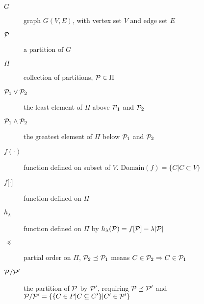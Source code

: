 \begin{description}
\item[$G$] graph $G(V,E)$, with vertex set $V$ and edge set $E$
\item[$\P$] a partition of $G$
\item[$\Pi$] collection of partitions, $\P \in \Pi$
\item[$\P_1 \vee \P_2$] the least element of $\Pi$ above $\P_1$ and $\P_2$
\item[$\P_1 \wedge \P_2$] the greatest element of $\Pi$ below $\P_1$ and $\P_2$
\item[$f(\cdot)$] function defined on subset of $V$. $\mathrm{Domain}(f)=\{C| C\subset V\}$
\item[$f{[}\cdot{]}$] function defined on $\Pi$
\item[$h_{\lambda}$] function defined on $\Pi$ by $h_{\lambda}(\P)=f[\P]-\lambda\abs{\P}$
\item[$\preceq$] partial order on $\Pi$, $\P_2 \preceq \P_1$ means $C\in \P_2 \Rightarrow C \in \P_1$
\item[$\P/\P'$] the partition of $\P$ by $\P'$, requiring $\P\preceq \P'$ and $\P/\P'=\{\{ C \in P | C \subseteq C' \} | C' \in \P'\}$
\end{description}

